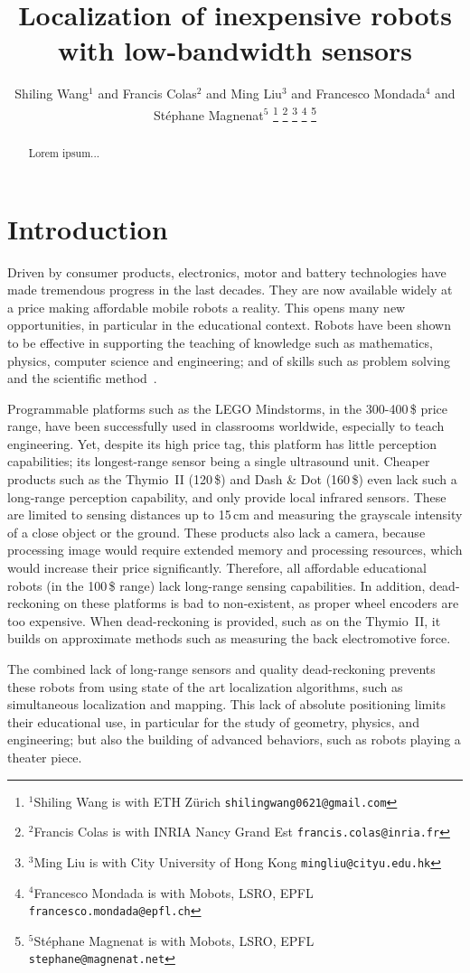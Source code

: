 \documentclass[letterpaper, 10pt, conference]{ieeeconf}
\title{\LARGE \bf
Localization of inexpensive robots with low-bandwidth sensors
}
\author{Shiling Wang$^{1}$ and Francis Colas$^{2}$ and Ming Liu$^{3}$ and Francesco Mondada$^{4}$ and Stéphane Magnenat$^{5}$%
\thanks{$^{1}$Shiling Wang is with ETH Zürich
        {\tt\small shilingwang0621@gmail.com}}%
\thanks{$^{2}$Francis Colas is with INRIA Nancy Grand Est
        {\tt\small francis.colas@inria.fr}}%
\thanks{$^{3}$Ming Liu is with City University of Hong Kong
        {\tt\small mingliu@cityu.edu.hk}}%
\thanks{$^{4}$Francesco Mondada is with Mobots, LSRO, EPFL
        {\tt\small francesco.mondada@epfl.ch}}%
\thanks{$^{5}$Stéphane Magnenat is with Mobots, LSRO, EPFL
        {\tt\small stephane@magnenat.net}}%
}
\begin{document}
\maketitle
\thispagestyle{empty}
\pagestyle{empty}

\begin{abstract}
Lorem ipsum...
\end{abstract}

\section{Introduction}

Driven by consumer products, electronics, motor and battery technologies have made tremendous progress in the last decades.
They are now available widely at a price making affordable mobile robots a reality.
This opens many new opportunities, in particular in the educational context.
Robots have been shown to be effective in supporting the teaching of knowledge such as mathematics, physics, computer science and engineering; and of skills such as problem solving and the scientific method~\cite{benitti2012explorin}.

Programmable platforms such as the LEGO Mindstorms, in the 300-400\,\$ price range, have been successfully used in classrooms worldwide, especially to teach engineering.
Yet, despite its high price tag, this platform has little perception capabilities; its longest-range sensor being a single ultrasound unit.
Cheaper products such as the Thymio~II (120\,\$) and Dash \& Dot (160\,\$) even lack such a long-range perception capability, and only provide local infrared sensors.
These are limited to sensing distances up to 15\,cm and measuring the grayscale intensity of a close object or the ground.
These products also lack a camera, because processing image would require extended memory and processing resources, which would increase their price significantly.
Therefore, all affordable educational robots (in the 100\,\$ range) lack long-range sensing capabilities.
In addition, dead-reckoning on these platforms is bad to non-existent, as proper wheel encoders are too expensive.
When dead-reckoning is provided, such as on the Thymio~II, it builds on approximate methods such as measuring the back electromotive force.

The combined lack of long-range sensors and quality dead-reckoning prevents these robots from using state of the art localization algorithms, such as simultaneous localization and mapping.
This lack of absolute positioning limits their educational use, in particular for the study of geometry, physics, and engineering; but also the building of advanced behaviors, such as robots playing a theater piece.
\end{document}
